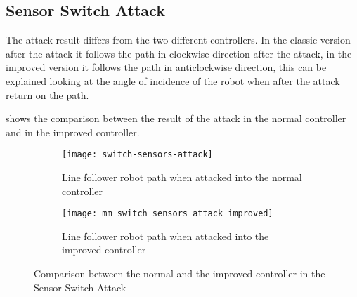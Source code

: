 \subsection{Sensor Switch Attack}

The attack result differs from the two different controllers. In the classic
version after the attack it follows the path in clockwise direction after the
attack, in the improved version it follows the path in anticlockwise direction,
this can be explained looking at the angle of incidence of the robot when after
the attack return on the path.

 shows the comparison between the result
of the attack in the normal controller and in the improved controller.

\begin{figure}[htb]
	\centering
	\begin{subfigure}[b]{0.45\textwidth}
		\centering
		\texttt{[image: switch-sensors-attack]}
		\caption{Line follower robot path when
		attacked into the normal controller}\label{fig:switchsenatt}
	\end{subfigure}
	\hfill
	\begin{subfigure}[b]{0.45\textwidth}
		\centering
		\texttt{[image: mm\_switch\_sensors\_attack\_improved]}
		\caption{Line follower robot path when
		attacked into the improved controller}\label{fig:switchsenattim}
	\end{subfigure}
	\caption{Comparison between the normal and the improved controller in
	the Sensor Switch Attack}\label{fig:switchsensorattackresults}
\end{figure}
